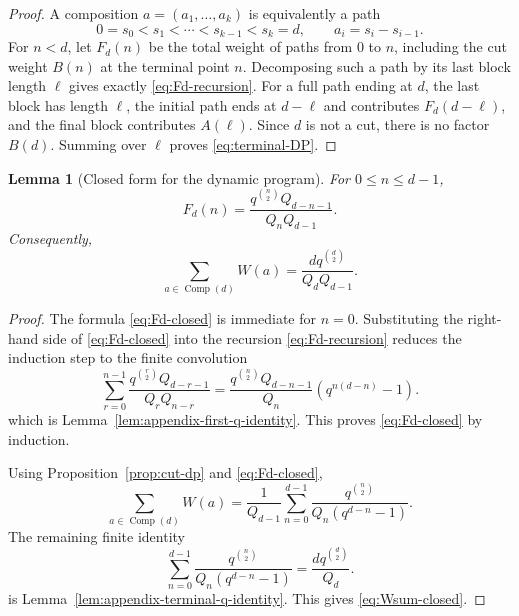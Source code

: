 \documentclass[11pt]{amsart}
\newcommand{\Comp}{\operatorname{Comp}}
\theoremstyle{plain}
\newtheorem{lemma}[theorem]{Lemma}
\theoremstyle{definition}
\numberwithin{equation}{section}
\begin{document}
\begin{proof}
A composition $a=(a_1,\ldots,a_k)$ is equivalently a path
\[
  0=s_0<s_1<\cdots<s_{k-1}<s_k=d,
  \qquad a_i=s_i-s_{i-1}.
\]
For $n<d$, let $F_d(n)$ be the total weight of paths from $0$ to $n$, including the cut
weight $B(n)$ at the terminal point $n$.  Decomposing such a path by its last block length
$\ell$ gives exactly \eqref{eq:Fd-recursion}.  For a full path ending at $d$, the last block has
length $\ell$, the initial path ends at $d-\ell$ and contributes $F_d(d-\ell)$, and the final
block contributes $A(\ell)$.  Since $d$ is not a cut, there is no factor $B(d)$.  Summing over
$\ell$ proves \eqref{eq:terminal-DP}.
\end{proof}

\begin{lemma}[Closed form for the dynamic program]\label{lem:closed-F}
For $0\le n\le d-1$,
\begin{equation}\label{eq:Fd-closed}
  F_d(n)=\frac{q^{\binom n2}Q_{d-n-1}}{Q_nQ_{d-1}}.
\end{equation}
Consequently,
\begin{equation}\label{eq:Wsum-closed}
  \sum_{a\in\Comp(d)}W(a)
  =\frac{dq^{\binom d2}}{Q_dQ_{d-1}}.
\end{equation}
\end{lemma}

\begin{proof}
The formula \eqref{eq:Fd-closed} is immediate for $n=0$.  Substituting the right-hand side
of \eqref{eq:Fd-closed} into the recursion \eqref{eq:Fd-recursion} reduces the induction
step to the finite convolution
\begin{equation}\label{eq:q-conv-induction}
  \sum_{r=0}^{n-1}
  \frac{q^{\binom r2}Q_{d-r-1}}{Q_rQ_{n-r}}
  =
  \frac{q^{\binom n2}Q_{d-n-1}}{Q_n}
  (q^{n(d-n)}-1).
\end{equation}
which is Lemma~\ref{lem:appendix-first-q-identity}.  This proves \eqref{eq:Fd-closed} by
induction.

Using Proposition~\ref{prop:cut-dp} and \eqref{eq:Fd-closed},
\[
  \sum_{a\in\Comp(d)}W(a)
  =
  \frac1{Q_{d-1}}
  \sum_{n=0}^{d-1}\frac{q^{\binom n2}}{Q_n(q^{d-n}-1)}.
\]
The remaining finite identity
\begin{equation}\label{eq:q-conv-terminal}
  \sum_{n=0}^{d-1}\frac{q^{\binom n2}}{Q_n(q^{d-n}-1)}
  =\frac{dq^{\binom d2}}{Q_d}.
\end{equation}
is Lemma~\ref{lem:appendix-terminal-q-identity}.  This gives \eqref{eq:Wsum-closed}.
\end{proof}
\end{document}
